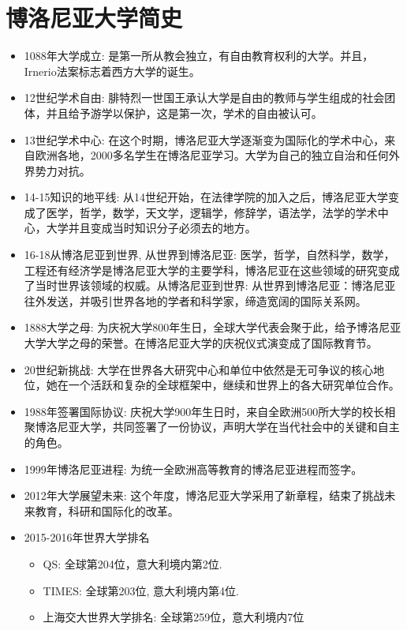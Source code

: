 \section{博洛尼亚大学简史}
\begin{itemize}
\item 1088年大学成立: 是第一所从教会独立，有自由教育权利的大学。并且，Irnerio法案\cite{irnerio}标志着西方大学的诞生。
\item 12世纪学术自由: 腓特烈一世国王承认大学是自由的教师与学生组成的社会团体，并且给予游学以保护，这是第一次，学术的自由被认可。
\item 13世纪学术中心: 在这个时期，博洛尼亚大学逐渐变为国际化的学术中心，来自欧洲各地，2000多名学生在博洛尼亚学习。大学为自己的独立自治和任何外界势力对抗。
\item 14-15知识的地平线: 从14世纪开始，在法律学院的加入之后，博洛尼亚大学变成了医学，哲学，数学，天文学，逻辑学，修辞学，语法学，法学的学术中心，大学并且变成当时知识分子必须去的地方。
\item 16-18从博洛尼亚到世界, 从世界到博洛尼亚: 医学，哲学，自然科学，数学，工程还有经济学是博洛尼亚大学的主要学科，博洛尼亚在这些领域的研究变成了当时世界该领域的权威。从博洛尼亚到世界: 从世界到博洛尼亚：博洛尼亚往外发送，并吸引世界各地的学者和科学家，缔造宽阔的国际关系网。
\item 1888大学之母: 为庆祝大学800年生日，全球大学代表会聚于此，给予博洛尼亚大学大学之母的荣誉。在博洛尼亚大学的庆祝仪式演变成了国际教育节。
\item 20世纪新挑战: 大学在世界各大研究中心和单位中依然是无可争议的核心地位，她在一个活跃和复杂的全球框架中，继续和世界上的各大研究单位合作。
\item 1988年签署国际协议: 庆祝大学900年生日时，来自全欧洲500所大学的校长相聚博洛尼亚大学，共同签署了一份协议，声明大学在当代社会中的关键和自主的角色。
\item 1999年博洛尼亚进程: 为统一全欧洲高等教育的博洛尼亚进程而签字。
\item 2012年大学展望未来: 这个年度，博洛尼亚大学采用了新章程，结束了挑战未来教育，科研和国际化的改革。
\item 2015-2016年世界大学排名
	\begin{itemize}
		\item QS\cite{qs}: 全球第204位，意大利境内第2位.
		\item TIMES\cite{times}: 全球第203位, 意大利境内第4位.
		\item 上海交大世界大学排名\cite{shanghai}: 全球第259位，意大利境内7位
	\end{itemize}
\end{itemize}
